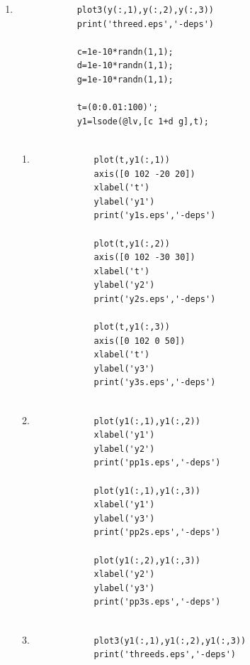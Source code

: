 \documentclass[11pt,a4paper]{article}
\begin{document}
\begin{enumerate}
\begin{enumerate}
		\item
		\begin{verbatim}
			plot3(y(:,1),y(:,2),y(:,3))
			print('threed.eps','-deps')
			
			c=1e-10*randn(1,1);
			d=1e-10*randn(1,1);
			g=1e-10*randn(1,1);

			t=(0:0.01:100)';
			y1=lsode(@lv,[c 1+d g],t);
			
		\end{verbatim}
		\begin{enumerate}
		\item
		\begin{verbatim}	
			plot(t,y1(:,1))
			axis([0 102 -20 20])
			xlabel('t')
			ylabel('y1')
			print('y1s.eps','-deps')

			plot(t,y1(:,2))
			axis([0 102 -30 30])
			xlabel('t')
			ylabel('y2')
			print('y2s.eps','-deps')

			plot(t,y1(:,3))
			axis([0 102 0 50])
			xlabel('t')
			ylabel('y3')
			print('y3s.eps','-deps')
			
		\end{verbatim}
		
		\item
		\begin{verbatim}
			plot(y1(:,1),y1(:,2))
			xlabel('y1')
			ylabel('y2')
			print('pp1s.eps','-deps')

			plot(y1(:,1),y1(:,3))
			xlabel('y1')
			ylabel('y3')
			print('pp2s.eps','-deps')

			plot(y1(:,2),y1(:,3))
			xlabel('y2')
			ylabel('y3')
			print('pp3s.eps','-deps')
			
		\end{verbatim}
		
		\item
		\begin{verbatim}
			plot3(y1(:,1),y1(:,2),y1(:,3))
			print('threeds.eps','-deps')
		\end{verbatim}
		
		\end{enumerate}
		
	\end{enumerate}
\end{enumerate}
\end{document}

